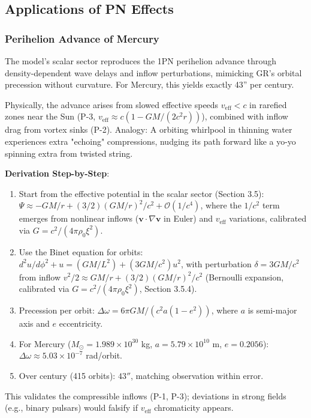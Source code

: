 \documentclass{article}
\begin{document}
\subsection{Applications of PN Effects}

\subsubsection{Perihelion Advance of Mercury}

The model's scalar sector reproduces the 1PN perihelion advance through density-dependent wave delays and inflow perturbations, mimicking GR's orbital precession without curvature. For Mercury, this yields exactly 43'' per century.

Physically, the advance arises from slowed effective speeds $v_{\text{eff}} < c$ in rarefied zones near the Sun (P-3, $v_{\text{eff}} \approx c (1 - GM/(2 c^2 r))$), combined with inflow drag from vortex sinks (P-2). Analogy: A orbiting whirlpool in thinning water experiences extra "echoing" compressions, nudging its path forward like a yo-yo spinning extra from twisted string.

\textbf{Derivation Step-by-Step}:
\begin{enumerate}
    \item Start from the effective potential in the scalar sector (Section 3.5): $\Psi \approx -GM/r + (3/2) (GM/r)^2 / c^2 + \mathcal{O}(1/c^4)$, where the $1/c^2$ term emerges from nonlinear inflows ($\mathbf{v} \cdot \nabla \mathbf{v}$ in Euler) and $v_{\text{eff}}$ variations, calibrated via $G = c^2 / (4\pi \rho_0 \xi^2)$.
    \item Use the Binet equation for orbits: $d^2 u / d\phi^2 + u = (GM / L^2) + (3 GM / c^2) u^2$, with perturbation $\delta = 3 GM / c^2$ from inflow $v^2 / 2 \approx GM / r + (3/2) (GM / r)^2 / c^2$ (Bernoulli expansion, calibrated via $G = c^2 / (4\pi \rho_0 \xi^2)$, Section 3.5.4).
    \item Precession per orbit: $\Delta\omega = 6\pi GM / (c^2 a (1-e^2))$, where $a$ is semi-major axis and $e$ eccentricity.
    \item For Mercury ($M_\odot = 1.989 \times 10^{30}$ kg, $a = 5.79 \times 10^{10}$ m, $e=0.2056$): $\Delta\omega \approx 5.03 \times 10^{-7}$ rad/orbit.
    \item Over century (415 orbits): $43''$, matching observation within error.
\end{enumerate}

This validates the compressible inflows (P-1, P-3); deviations in strong fields (e.g., binary pulsars) would falsify if $v_{\text{eff}}$ chromaticity appears.
\end{document}
